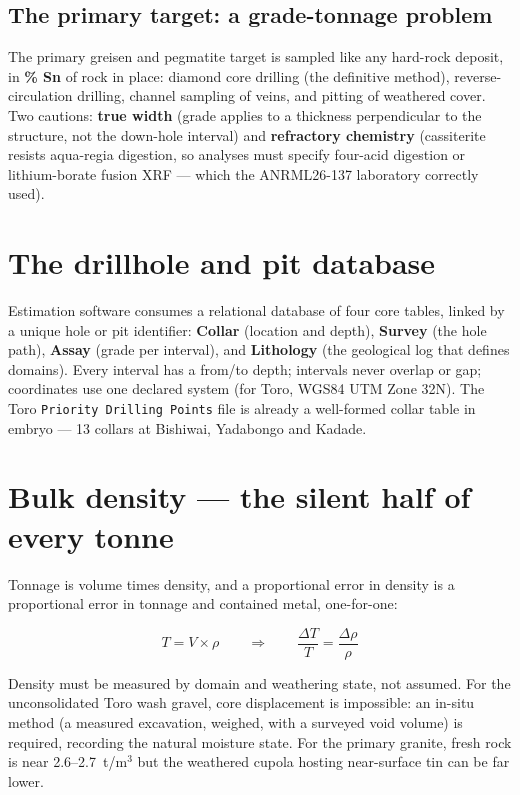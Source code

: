 \documentclass[11pt]{article}
\begin{document}
\subsection{The primary target: a grade-tonnage problem}

The primary greisen and pegmatite target is sampled like any hard-rock
deposit, in \textbf{\% Sn} of rock in place: diamond core drilling (the
definitive method), reverse-circulation drilling, channel sampling of
veins, and pitting of weathered cover. Two cautions: \textbf{true width}
(grade applies to a thickness perpendicular to the structure, not the
down-hole interval) and \textbf{refractory chemistry} (cassiterite
resists aqua-regia digestion, so analyses must specify four-acid
digestion or lithium-borate fusion XRF --- which the ANRML26-137
laboratory correctly used).

\section{The drillhole and pit database}

Estimation software consumes a relational database of four core tables,
linked by a unique hole or pit identifier: \textbf{Collar} (location and
depth), \textbf{Survey} (the hole path), \textbf{Assay} (grade per
interval), and \textbf{Lithology} (the geological log that defines
domains). Every interval has a from/to depth; intervals never overlap or
gap; coordinates use one declared system (for Toro, WGS84 UTM Zone 32N).
The Toro \texttt{Priority Drilling Points} file is already a well-formed
collar table in embryo --- 13 collars at Bishiwai, Yadabongo and Kadade.

\section{Bulk density --- the silent half of every tonne}

Tonnage is volume times density, and a proportional error in density is a
proportional error in tonnage and contained metal, one-for-one:

\begin{eqbox}
\[ T = V \times \rho \qquad\Longrightarrow\qquad
   \frac{\Delta T}{T} = \frac{\Delta\rho}{\rho} \tag{2.5}\]
\end{eqbox}

Density must be measured by domain and weathering state, not assumed. For
the unconsolidated Toro wash gravel, core displacement is impossible: an
in-situ method (a measured excavation, weighed, with a surveyed void
volume) is required, recording the natural moisture state. For the
primary granite, fresh rock is near 2.6--2.7~t/m$^3$ but the weathered
cupola hosting near-surface tin can be far lower.
\end{document}
